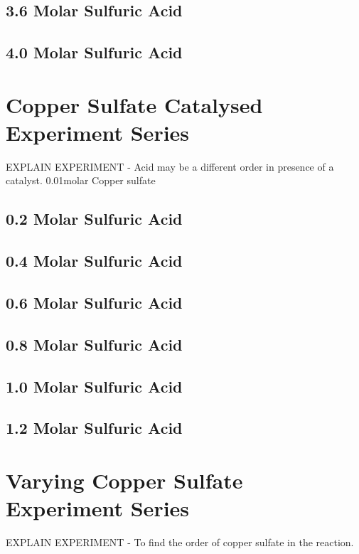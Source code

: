 	\subsection{3.6 Molar Sulfuric Acid}

	\subsection{4.0 Molar Sulfuric Acid}

\section{Copper Sulfate Catalysed Experiment Series}

EXPLAIN EXPERIMENT - Acid may be a different order in presence of a catalyst. 0.01molar Copper sulfate 

	\subsection{0.2 Molar Sulfuric Acid}

	\subsection{0.4 Molar Sulfuric Acid}

	\subsection{0.6 Molar Sulfuric Acid}

	\subsection{0.8 Molar Sulfuric Acid}

	\subsection{1.0 Molar Sulfuric Acid}

	\subsection{1.2 Molar Sulfuric Acid}


\section{Varying Copper Sulfate Experiment Series}

EXPLAIN EXPERIMENT - To find the order of copper sulfate in the reaction.

